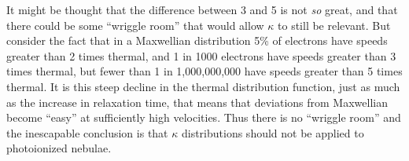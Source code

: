 \documentclass[11pt]{article}
\begin{document}
It might be thought that the difference between 3 and 5 is not \emph{so} great, and that there could be some ``wriggle room'' that would allow \(\kappa\) to still be relevant.  But consider the fact that in a Maxwellian distribution 5\% of electrons have speeds greater than 2 times thermal, and 1 in 1000 electrons have speeds greater than 3 times thermal, but fewer than 1 in 1,000,000,000 have speeds greater than 5 times thermal.  It is this steep decline in the thermal distribution function, just as much as the increase in relaxation time, that means that deviations from Maxwellian become ``easy'' at sufficiently high velocities.  Thus there is no ``wriggle room'' and the inescapable conclusion is that \(\kappa\) distributions should not be applied to photoionized nebulae.
\end{document}
